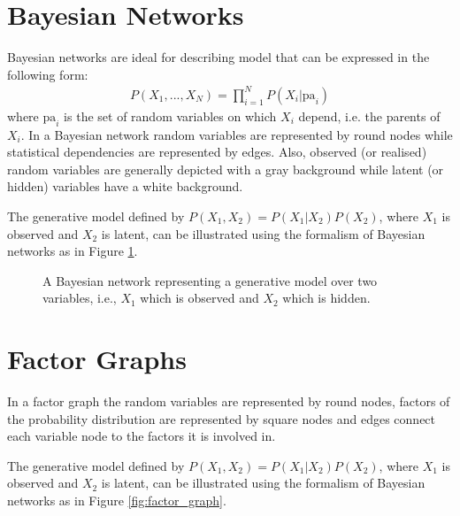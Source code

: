 \documentclass[11pt,fleqn]{book} %
\begin{document}
\section{Bayesian Networks}

Bayesian networks \cite{BayesianNetworks} are ideal for describing model that can be expressed in the following form:
\begin{align*}
P(X_1,...,X_N) = \prod_{i = 1}^N P(X_i|\text{pa}_i)
\end{align*}
where $\text{pa}_i$ is the set of random variables on which $X_i$ depend, i.e. the parents of $X_i$. In a Bayesian network random variables are represented by round nodes while statistical dependencies are represented by edges. Also, observed (or realised) random variables are generally depicted with a gray background while latent (or hidden) variables have a white background.

\begin{example}
The generative model defined by $P(X_1,X_2) = P(X_1|X_2)P(X_2)$, where $X_1$ is observed and $X_2$ is latent, can be illustrated using the formalism of Bayesian networks as in Figure \ref{fig:bayesian_network}.
\end{example}

\begin{figure}[H]
	\begin{center}
	\end{center}
\vspace{-0.25cm}
    \caption{A Bayesian network representing a generative model over two variables, i.e., $X_1$ which is observed and $X_2$ which is hidden.}
    \label{fig:bayesian_network}
\end{figure}

\section{Factor Graphs}\label{sec:ffg}

In a factor graph \cite{FG} the random variables are represented by round nodes, factors of the probability distribution are represented by square nodes and edges connect each variable node to the factors it is involved in.

\begin{example}
The generative model defined by $P(X_1,X_2) = P(X_1|X_2)P(X_2)$, where $X_1$ is observed and $X_2$ is latent, can be illustrated using the formalism of Bayesian networks as in Figure \ref{fig:factor_graph}.
\end{example}
\end{document}
